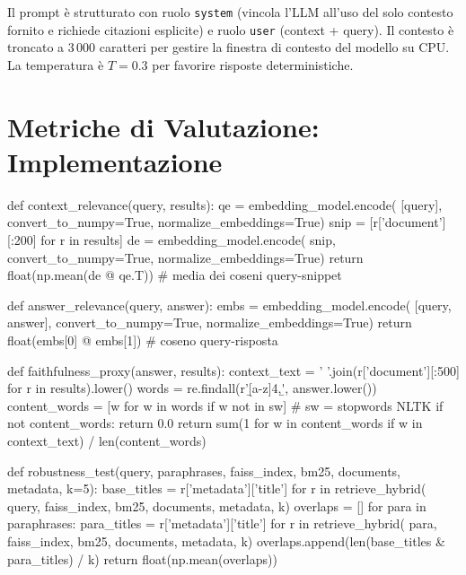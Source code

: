 \documentclass[12pt,a4paper]{article}
\begin{document}
Il prompt \`e strutturato con ruolo \texttt{system} (vincola l'LLM all'uso del solo contesto fornito e richiede citazioni esplicite) e ruolo \texttt{user} (context + query). Il contesto \`e troncato a 3\,000 caratteri per gestire la finestra di contesto del modello su CPU. La temperatura \`e $T=0.3$ per favorire risposte deterministiche.

\section{Metriche di Valutazione: Implementazione}

\begin{pylisting}[title={Context Relevance e Answer Relevance}]
def context_relevance(query, results):
    qe   = embedding_model.encode(
               [query], convert_to_numpy=True, normalize_embeddings=True)
    snip = [r['document'][:200] for r in results]
    de   = embedding_model.encode(
               snip, convert_to_numpy=True, normalize_embeddings=True)
    return float(np.mean(de @ qe.T))   # media dei coseni query-snippet

def answer_relevance(query, answer):
    embs = embedding_model.encode(
               [query, answer], convert_to_numpy=True, normalize_embeddings=True)
    return float(embs[0] @ embs[1])    # coseno query-risposta
\end{pylisting}

\begin{pylisting}[title={Faithfulness proxy e robustezza}]
def faithfulness_proxy(answer, results):
    context_text  = ' '.join(r['document'][:500] for r in results).lower()
    words         = re.findall(r'\b[a-z]{4,}\b', answer.lower())
    content_words = [w for w in words if w not in sw]  # sw = stopwords NLTK
    if not content_words:
        return 0.0
    return sum(1 for w in content_words if w in context_text) / len(content_words)

def robustness_test(query, paraphrases, faiss_index, bm25,
                    documents, metadata, k=5):
    base_titles = {r['metadata']['title']
                   for r in retrieve_hybrid(
                       query, faiss_index, bm25, documents, metadata, k)}
    overlaps = []
    for para in paraphrases:
        para_titles = {r['metadata']['title']
                       for r in retrieve_hybrid(
                           para, faiss_index, bm25, documents, metadata, k)}
        overlaps.append(len(base_titles & para_titles) / k)
    return float(np.mean(overlaps))
\end{pylisting}
\end{document}
